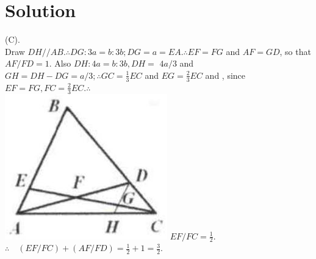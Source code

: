 \documentclass{article}
\begin{document}
\section*{Solution}
(C).\\
Draw \(D H / / A B . \therefore D G: 3 a=b: 3 b ; D G=a=E A . \therefore E F=F G\) and \(A F=G D\), so that \(A F / F D=1\). Also \(D H: 4 a=b: 3 b, D H=\) \(4 a / 3\) and \(G H=D H-D G=a / 3 ; \therefore G C=\frac{1}{3} E C\) and \(E G=\frac{2}{3} E C\) and , since \(E F=F G, F C=\frac{2}{3} E C . \therefore\)\\
\includegraphics[width=\textwidth]{images/reasoning_image_1.jpg} \(E F / F C=\frac{1}{2}\).\\
\(\therefore \quad(E F / F C)+(A F / F D)=\frac{1}{2}+1=\frac{3}{2}\).\\
\end{document}
